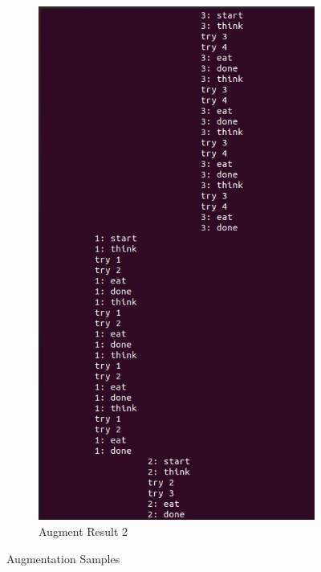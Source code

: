 \documentclass[11pt,a4paper]{article}
\begin{document}
\begin{figure}[h]
\begin{subfigure}[b]{0.2\textwidth}
		\includegraphics[width=1\textwidth]{Figure/dining no deadlock(2).png}
		\caption{Augment Result 2}
		\label{fig:aug-2}
	\end{subfigure}
	\caption{Augmentation Samples}\label{fig:aug}
\end{figure}
\qquad %
\end{document}
